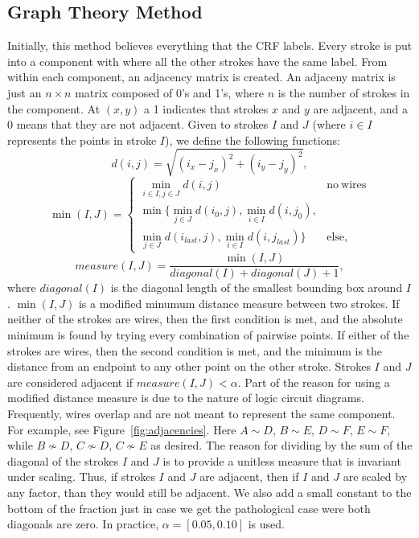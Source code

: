 \documentclass[10pt]{acmsiggraph}               %
\begin{document}
\subsection{Graph Theory Method}
Initially, this method believes everything that the CRF labels.
Every stroke is put into a component with where all the other strokes have the same label.
From within each component, an adjacency matrix is created.
An adjaceny matrix is just an $n \times n$ matrix composed of 0's and 1's, where $n$ is the number of strokes in the component.
At $(x, y)$ a 1 indicates that strokes $x$ and $y$ are adjacent, and a 0 means that they are not adjacent.
Given to strokes $I$ and $J$ (where $i \in I$ represents the points in stroke $I$), we define the following functions:
$$
d(i, j) = \sqrt{(i_x - j_x)^2 + (i_y - j_y)^2},
$$
\[
\min(I, J) = \left\{
\begin{matrix}
\min_{i \in I, j \in J} d(i, j) & \mathrm{no\ wires}\\
\min\{
	\min_{j \in J} d(i_0, j),
	\min_{i \in I} d(i, j_0),\\
	\min_{j \in J} d(i_{last}, j),
	\min_{i \in I} d(i, j_{last})
	\} & \mathrm{else,}
\end{matrix} \right.
\]
$$
measure(I, J) = \frac{\min(I, J)}{diagonal(I) + diagonal(J) + 1},
$$
where $diagonal(I)$ is the diagonal length of the smallest bounding box around $I$.
$\min(I, J)$ is a modified minumum distance measure between two strokes.
If neither of the strokes are wires, then the first condition is met, and the absolute minimum is found by trying every combination of pairwise points.
If either of the strokes are wires, then the second condition is met, and the minimum is the distance from an endpoint to any other point on the other stroke.
Strokes $I$ and $J$ are considered adjacent if $measure(I, J) < \alpha$.
Part of the reason for using a modified distance measure is due to the nature of logic circuit diagrams.
Frequently, wires overlap and are not meant to represent the same component.
For example, see Figure~\ref{fig:adjacencies}.
Here $A\sim D$, $B\sim E$, $D\sim F$, $E\sim F$, while $B\not \sim D$, $C\not \sim D$, $C\not \sim E$ as desired.
The reason for dividing by the sum of the diagonal of the strokes $I$ and $J$ is to provide a unitless measure that is invariant under scaling.
Thus, if strokes $I$ and $J$ are adjacent, then if $I$ and $J$ are scaled by any factor, than they would still be adjacent.
We also add a small constant to the bottom of the fraction just in case we get the pathological case were both diagonals are zero.
In practice, $\alpha = [0.05, 0.10]$ is used. 
\end{document}
